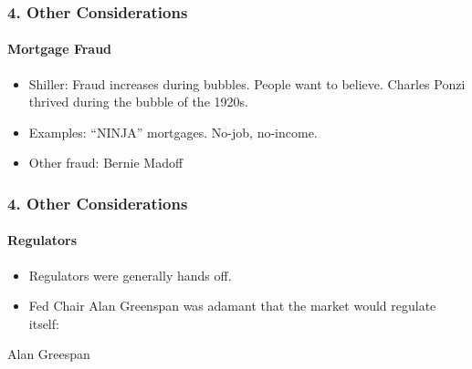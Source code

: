 \documentclass{beamer}
\begin{document}
\begin{frame}[t]
    \frametitle{4. Other Considerations}
    \framesubtitle{Mortgage Fraud}

\begin{itemize}
    \item Shiller: Fraud increases during bubbles.   People want to believe.   Charles Ponzi thrived during the bubble of the 1920s.
    \item Examples: “NINJA” mortgages.   No-job, no-income.
    \item Other fraud: Bernie Madoff
\end{itemize}

\end{frame}

\begin{frame}[t]
\frametitle{4. Other Considerations}
\framesubtitle{Regulators}

    \begin{itemize}
        \item Regulators were generally hands off.
        \item Fed Chair Alan Greenspan was adamant that the market would regulate itself:
    \end{itemize}   
    \vspace{3em}

    {Alan Greespan}
 

\end{frame}
\end{document}
